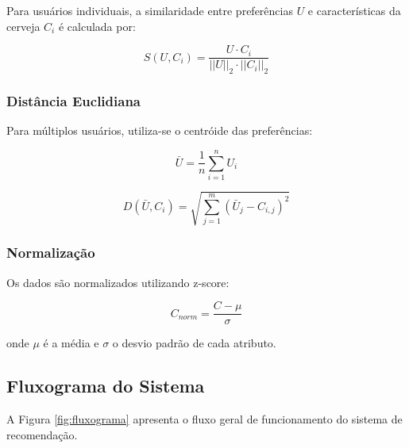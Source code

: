 \documentclass[12pt,a4paper]{article}
\begin{document}
Para usuários individuais, a similaridade entre preferências $U$ e características da cerveja $C_i$ é calculada por:

\begin{equation}
S(U, C_i) = \frac{U \cdot C_i}{||U||_2 \cdot ||C_i||_2}
\end{equation}

\subsubsection{Distância Euclidiana}

Para múltiplos usuários, utiliza-se o centróide das preferências:

\begin{equation}
\bar{U} = \frac{1}{n}\sum_{i=1}^{n} U_i
\end{equation}

\begin{equation}
D(\bar{U}, C_i) = \sqrt{\sum_{j=1}^{m} (\bar{U}_j - C_{i,j})^2}
\end{equation}

\subsubsection{Normalização}

Os dados são normalizados utilizando z-score:

\begin{equation}
C_{norm} = \frac{C - \mu}{\sigma}
\end{equation}

onde $\mu$ é a média e $\sigma$ o desvio padrão de cada atributo.

\subsection{Fluxograma do Sistema}

A Figura \ref{fig:fluxograma} apresenta o fluxo geral de funcionamento do sistema de recomendação.
\end{document}

